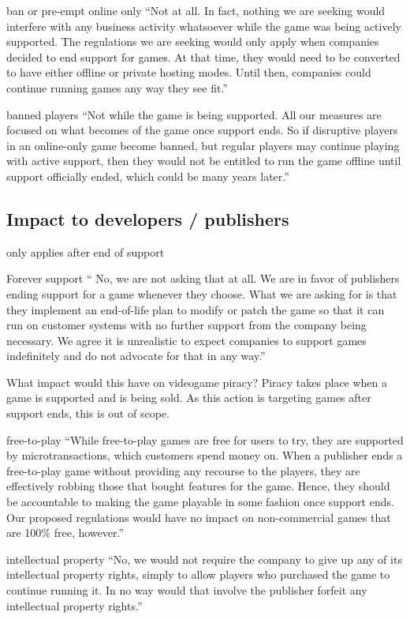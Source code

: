 ban or pre-empt online only
``Not at all. In fact, nothing we are seeking would interfere with any business activity whatsoever while the game was being actively supported.
The regulations we are seeking would only apply when companies decided to end support for games.
At that time, they would need to be converted to have either offline or private hosting modes.
Until then, companies could continue running games any way they see fit.''

banned players
``Not while the game is being supported.
All our measures are focused on what becomes of the game once support ends.
So if disruptive players in an online-only game become banned, but regular players may continue playing with active support,
then they would not be entitled to run the game offline until support officially ended, which could be many years later.\cn''


\subsection{Impact to developers / publishers}
only applies after end of support

Forever support
`` No, we are not asking that at all. We are in favor of publishers ending support for a game whenever they choose.
What we are asking for is that they implement an end-of-life plan to modify or patch the game
so that it can run on customer systems with no further support from the company being necessary.
We agree it is unrealistic to expect companies to support games indefinitely and do not advocate for that in any way.''

What impact would this have on videogame piracy?
Piracy takes place when a game is supported and is being sold. As this action is targeting games after support ends, this is out of scope.

free-to-play
``While free-to-play games are free for users to try, they are supported by microtransactions, which customers spend money on.
When a publisher ends a free-to-play game without providing any recourse to the players, they are effectively robbing those that bought features for the game.
Hence, they should be accountable to making the game playable in some fashion once support ends.
Our proposed regulations would have no impact on non-commercial games that are 100\% free, however.''

intellectual property
``No, we would not require the company to give up any of its intellectual property rights, simply to allow players who purchased the game to continue running it.
In no way would that involve the publisher forfeit any intellectual property rights.''

